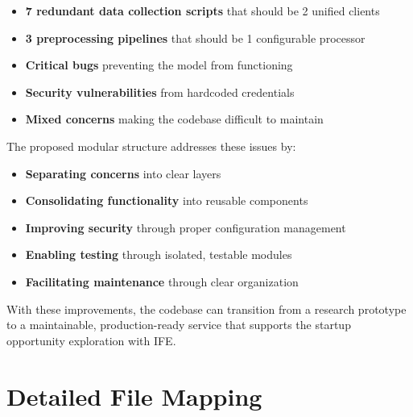 \documentclass[11pt,a4paper]{article}
\begin{document}
\begin{itemize}
    \item \textbf{7 redundant data collection scripts} that should be 2 unified clients
    \item \textbf{3 preprocessing pipelines} that should be 1 configurable processor
    \item \textbf{Critical bugs} preventing the model from functioning
    \item \textbf{Security vulnerabilities} from hardcoded credentials
    \item \textbf{Mixed concerns} making the codebase difficult to maintain
\end{itemize}

The proposed modular structure addresses these issues by:

\begin{itemize}
    \item \textbf{Separating concerns} into clear layers
    \item \textbf{Consolidating functionality} into reusable components
    \item \textbf{Improving security} through proper configuration management
    \item \textbf{Enabling testing} through isolated, testable modules
    \item \textbf{Facilitating maintenance} through clear organization
\end{itemize}

With these improvements, the codebase can transition from a research prototype to a maintainable, production-ready service that supports the startup opportunity exploration with IFE.

\appendix

\section{Detailed File Mapping}
\end{document}
